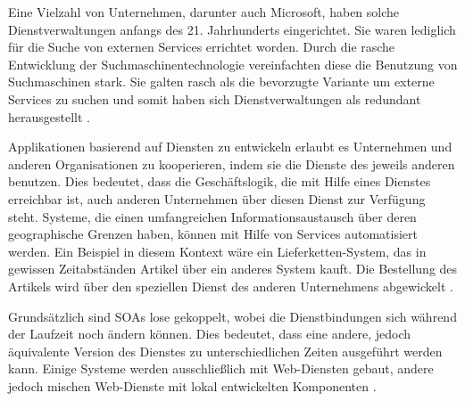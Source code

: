 Eine Vielzahl von Unternehmen, darunter auch Microsoft, haben solche Dienstverwaltungen anfangs des 21. Jahrhunderts eingerichtet. Sie waren lediglich für die Suche von externen Services errichtet worden. Durch die rasche Entwicklung der Suchmaschinentechnologie vereinfachten diese die Benutzung von Suchmaschinen stark. Sie galten rasch als die bevorzugte Variante um externe Services zu suchen und somit haben sich Dienstverwaltungen als redundant herausgestellt \citereset \autocite[siehe][S. 511]{Sommerville.2011}.

Applikationen basierend auf Diensten zu entwickeln erlaubt es Unternehmen und anderen Organisationen zu kooperieren, indem sie die Dienste des jeweils anderen benutzen. Dies bedeutet, dass die Geschäftslogik, die mit Hilfe eines Dienstes erreichbar ist, auch anderen Unternehmen über diesen Dienst zur Verfügung steht. Systeme, die einen umfangreichen Informationsaustausch über deren geographische Grenzen haben, können mit Hilfe von Services automatisiert werden. Ein Beispiel in diesem Kontext wäre ein Lieferketten-System, das in gewissen Zeitabständen Artikel über ein anderes System kauft.
Die Bestellung des Artikels wird über den speziellen Dienst des anderen Unternehmens abgewickelt \citereset \autocite[siehe][S. 512]{Sommerville.2011}.

Grundsätzlich sind SOAs lose gekoppelt, wobei die Dienstbindungen sich während der Laufzeit noch ändern können. Dies bedeutet, dass eine andere, jedoch äquivalente Version des Dienstes zu unterschiedlichen Zeiten ausgeführt werden kann. Einige Systeme werden ausschließlich mit Web-Diensten gebaut, andere jedoch mischen Web-Dienste mit lokal entwickelten Komponenten \citereset \autocite[siehe][S. 512]{Sommerville.2011}.

